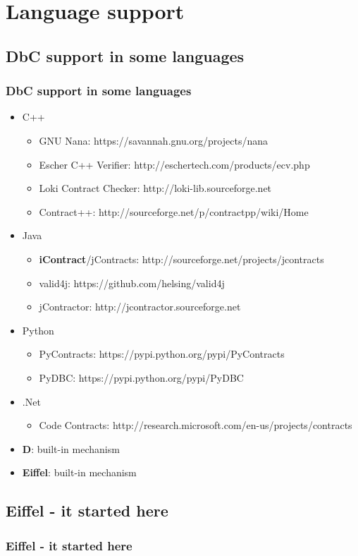 \documentclass{beamer}
\begin{document}
\section{Language support}
\subsection{DbC support in some languages}
\begin{frame}
\frametitle{DbC support in some languages}
\begin{itemize}
  \item C++
  \begin{itemize}
    \item GNU Nana: https://savannah.gnu.org/projects/nana
    \item Escher C++ Verifier: http://eschertech.com/products/ecv.php
    \item Loki Contract Checker: http://loki-lib.sourceforge.net
    \item Contract++: http://sourceforge.net/p/contractpp/wiki/Home
  \end{itemize}
  \item Java
  \begin{itemize}
    \item \textbf{iContract}/jContracts: http://sourceforge.net/projects/jcontracts
    \item valid4j: https://github.com/helsing/valid4j
    \item jContractor: http://jcontractor.sourceforge.net
  \end{itemize}
  \item Python
  \begin{itemize}
    \item PyContracts: https://pypi.python.org/pypi/PyContracts
    \item PyDBC: https://pypi.python.org/pypi/PyDBC
  \end{itemize}
  \item .Net
  \begin{itemize}
    \item Code Contracts: http://research.microsoft.com/en-us/projects/contracts
  \end{itemize}
  \item \textbf{D}: built-in mechanism
  \item \textbf{Eiffel}: built-in mechanism
\end{itemize}
\end{frame}

\subsection{Eiffel - it started here}
\begin{frame}[fragile]
\frametitle{Eiffel - it started here}

\end{frame}
\end{document}
